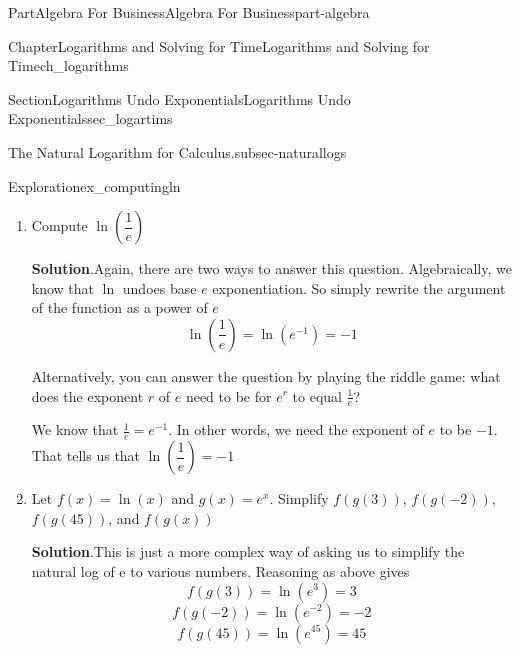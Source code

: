 \documentclass{tufte-book}
\newcommand{\blocktitlefont}{\relax}
\numberwithin{equation}{chapter}
\begin{document}
\begin{partptx}{Part}{Algebra For Business}{}{Algebra For Business}{}{}{part-algebra}
\begin{chapterptx}{Chapter}{Logarithms and Solving for Time}{}{Logarithms and Solving for Time}{}{}{ch_logarithms}
\begin{sectionptx}{Section}{Logarithms Undo Exponentials}{}{Logarithms Undo Exponentials}{}{}{sec_logartims}
\begin{paragraphs}{The Natural Logarithm for Calculus.}{subsec-naturallogs}
\begin{exploration}{Exploration}{}{ex_computingln}
\begin{enumerate}[font=\bfseries,label=(\alph*),ref=\alph*]
\noindent\textbf{\blocktitlefont Solution}.\hypertarget{ex_computingln-1-2}{}\quad{}There are two ways to answer this question.  Algebraically, we know that \(\ln\) undoes base \(e\) exponentiation.  So simply rewrite the argument of the function as a power of \(e\)%
\begin{equation*}
\ln(\sqrt{e}) = \ln(e^{1/2}) = \frac{1}{2}
\end{equation*}
%
\par
Alternatively, you can answer the question by playing the riddle game: what does the exponent \(r\) of \(e\) need to be for \(e^{r}\) to equal \(\sqrt{e}\)?%
\par
We know that \(\sqrt{e} = e^{1/2}\).  In other words, we need the exponent of \(e\) to be \(\frac{1}{2}\).  That tells us that \(\ln(\sqrt{e}) = \frac{1}{2}\)%
\item{}Compute \(\ln\left(\dfrac{1}{e}\right)\)%
\par\smallskip%
\noindent\textbf{\blocktitlefont Solution}.\hypertarget{ex_computingln-2-2}{}\quad{}Again, there are two ways to answer this question.  Algebraically, we know that \(\ln\) undoes base \(e\) exponentiation.  So simply rewrite the argument of the function as a power of \(e\)%
\begin{equation*}
\ln\left(\dfrac{1}{e}\right) = \ln(e^{-1}) = -1
\end{equation*}
%
\par
Alternatively, you can answer the question by playing the riddle game: what does the exponent \(r\) of \(e\) need to be for \(e^{r}\) to equal \(\frac{1}{e}\)?%
\par
We know that \(\frac{1}{e} = e^{-1}\).  In other words, we need the exponent of \(e\) to be \(-1\).  That tells us that \(\ln\left(\dfrac{1}{e}\right) = -1\)%
\item{}Let \(f(x) = \ln(x)\) and \(g(x) = e^x\). Simplify \(f(g(3))\), \(f(g(-2))\), \(f(g(45))\), and \(f(g(x))\)%
\par\smallskip%
\noindent\textbf{\blocktitlefont Solution}.\hypertarget{ex_computingln-3-2}{}\quad{}This is just a more complex way of asking us to simplify the natural log of e to various numbers. Reasoning as above gives%
\begin{equation*}
f(g(3)) = \ln(e^3) = 3
\end{equation*}
%
\begin{equation*}
f(g(-2)) = \ln(e^{-2}) = -2
\end{equation*}
%
\begin{equation*}
f(g(45)) = \ln(e^{45}) = 45

\end{equation*}
\end{enumerate}
\end{exploration}
\end{paragraphs}
\end{sectionptx}
\end{chapterptx}
\end{partptx}
\end{document}
